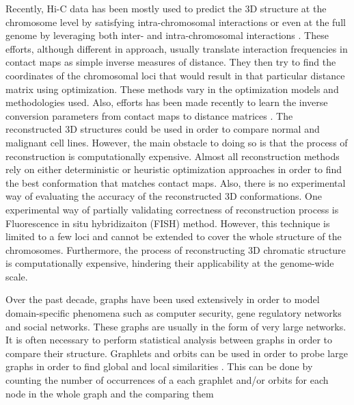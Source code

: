 \documentclass[a4,center,fleqn]{NAR}
\begin{document}
Recently, Hi-C data has been mostly used to predict
the 3D structure at the chromosome level by satisfying
intra-chromosomal interactions or even at the
full genome by leveraging both inter- and intra-chromosomal
interactions
\cite{noble2011three, 
rousseau2011three, 
hu2013bayesian, 
varoquaux2014statistical, 
trieu2014large, 
zhang20133d, 
lesne20143d, 
bau2011three, 
adhikari2016chromosome3d}.
These efforts, although different in
approach, usually translate interaction frequencies in
contact maps as simple inverse measures of distance.
They then try to find the coordinates of the chromosomal
loci that would result in that particular distance
matrix using optimization. These methods vary in
the optimization models and methodologies used.
Also, efforts has been made recently to learn the
inverse conversion parameters from contact maps
to distance matrices \cite{oluwadare2018maximum}.
The reconstructed 3D structures could be used in
order to compare normal and malignant cell lines.
However, the main obstacle to doing so is that
the process of reconstruction is computationally expensive.
Almost all reconstruction methods rely on either
deterministic or heuristic optimization approaches in
order to find the best conformation that matches contact
maps. Also, there is no experimental way of evaluating
the accuracy of the reconstructed 3D conformations.
One experimental way of partially validating correctness
of reconstruction process is Fluorescence in
situ hybridizaiton (FISH) method. However, this
technique is limited to a few loci and cannot be
extended to cover the whole structure of the chromosomes.
Furthermore, the process of reconstructing 3D
chromatic structure is computationally expensive,
hindering their applicability at the genome-wide scale.
\enlargethispage{-65.1pt}


Over the past decade, graphs have been used extensively
in order to model domain-specific phenomena such
as computer security, gene regulatory networks and
social networks. These graphs are usually in
the form of very large networks. It is often necessary
to perform statistical analysis between graphs in
order to compare their structure. Graphlets and
orbits can be used in order to probe large graphs
in order to find global and local similarities 
\cite{shervashidze2009efficient, borgs2006counting,
bondy1977graph}.
This can be done by counting the number of occurrences
of a each graphlet and/or orbits for each node
in the whole graph and the comparing them \cite{prvzulj2007biological,
prvzulj2004modeling}
\end{document}
